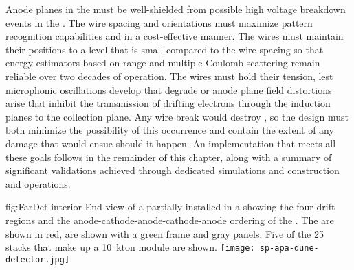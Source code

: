 Anode planes in the  must be well-shielded from possible high voltage breakdown events in the .  The  wire spacing and orientations must maximize pattern recognition capabilities and  in a cost-effective manner.  The  wires must maintain their positions to a level that is small compared to the wire spacing so that energy estimators based on range and multiple Coulomb scattering remain reliable over two decades of operation.  The wires must hold their tension, lest microphonic oscillations develop that degrade  or anode plane field distortions arise that inhibit the transmission of drifting electrons through the induction planes to the collection plane.  Any wire break would destroy , so the  design must both minimize the possibility of this occurrence and contain the extent of any damage that would ensue should it happen.  An  implementation that meets all these goals follows in the remainder of this chapter, along with a summary of significant validations achieved through dedicated simulations and  construction and operations.

\begin{dunefigure}{fig:FarDet-interior}
{End view of a partially installed   in a   showing the four drift regions and the anode-cathode-anode-cathode-anode ordering of the  . The  are shown in red,  are shown with a green frame and gray panels. Five of the 25  stacks that make up a \SI{10}{kton}  module are shown.}
\texttt{[image: sp-apa-dune-detector.jpg]}
\end{dunefigure}

